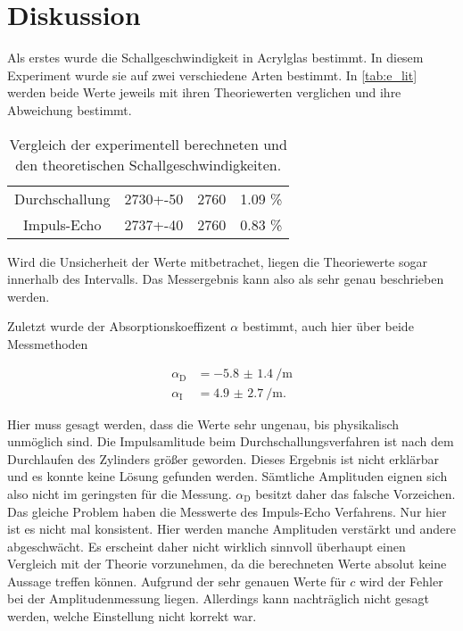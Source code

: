 \section{Diskussion}
\label{sec:Diskussion}


Als erstes wurde die Schallgeschwindigkeit in Acrylglas bestimmt.
In diesem Experiment wurde sie auf zwei verschiedene Arten bestimmt.
In \autoref{tab:e_lit} werden beide Werte jeweils mit ihren Theoriewerten verglichen und ihre Abweichung bestimmt.

\begin{table}
  \centering
  \caption{Vergleich der experimentell berechneten und den theoretischen Schallgeschwindigkeiten.\cite{schallgeschw}}
  \label{tab:e_lit}
  \begin{tabular}{c S[table-format=4.0,table-figures-uncertainty = 1] S[table-format=4.0] S[table-format=1.2]}
    \toprule 
    &  &  &  \\ 
    \midrule 
    Durchschallung & 2730+-50 & 2760 & 1.09 \% \\
    Impuls-Echo & 2737+-40 & 2760 & 0.83 \% \\
    \bottomrule
  \end{tabular}
\end{table}

Wird die Unsicherheit der Werte mitbetrachet, liegen die Theoriewerte sogar innerhalb des Intervalls.
Das Messergebnis kann also als sehr genau beschrieben werden.

Zuletzt wurde der Absorptionskoeffizent $\alpha$ bestimmt, auch hier über beide Messmethoden

\begin{align}
    \alpha _\text{D} &= \SI{-5.8(14)}{\per\meter}\\
    \alpha _\text{I} &= \SI{4.9(27)}{\per\meter}.
\end{align}

Hier muss gesagt werden, dass die Werte sehr ungenau, bis physikalisch unmöglich sind.
Die Impulsamlitude beim Durchschallungsverfahren ist nach dem Durchlaufen des Zylinders größer geworden.
Dieses Ergebnis ist nicht erklärbar und es konnte keine Lösung gefunden werden.
Sämtliche Amplituden eignen sich also nicht im geringsten für die Messung.
$\alpha _\text{D}$ besitzt daher das falsche Vorzeichen.
Das gleiche Problem haben die Messwerte des Impuls-Echo Verfahrens.
Nur hier ist es nicht mal konsistent. Hier werden manche Amplituden verstärkt und andere abgeschwächt. 
Es erscheint daher nicht wirklich sinnvoll überhaupt einen Vergleich mit der Theorie vorzunehmen, da die berechneten Werte absolut keine Aussage treffen können.
Aufgrund der sehr genauen Werte für $c$ wird der Fehler bei der Amplitudenmessung liegen.
Allerdings kann nachträglich nicht gesagt werden, welche Einstellung nicht korrekt war.
